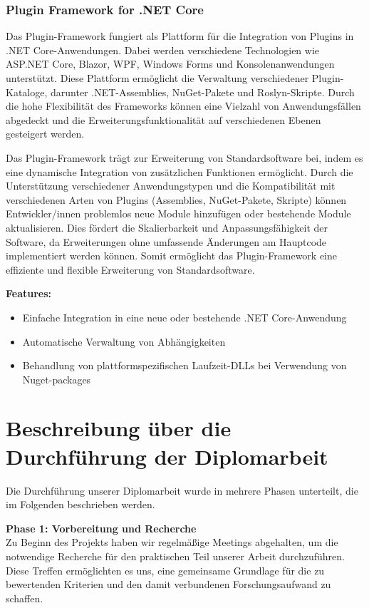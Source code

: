 \subsubsection*{Plugin Framework for .NET Core}

Das Plugin-Framework fungiert als Plattform für die Integration von Plugins in .NET Core-Anwendungen. 
Dabei werden verschiedene Technologien wie ASP.NET Core, Blazor, WPF, Windows Forms und 
Konsolenanwendungen unterstützt. Diese Plattform ermöglicht die Verwaltung verschiedener 
Plugin-Kataloge, darunter .NET-Assemblies, NuGet-Pakete und Roslyn-Skripte. Durch die hohe 
Flexibilität des Frameworks können eine Vielzahl von Anwendungsfällen abgedeckt und die 
Erweiterungsfunktionalität auf verschiedenen Ebenen gesteigert werden. 
\cite{pluginframework}

Das Plugin-Framework trägt zur Erweiterung von Standardsoftware bei, indem es eine dynamische 
Integration von zusätzlichen Funktionen ermöglicht. Durch die Unterstützung verschiedener 
Anwendungstypen und die Kompatibilität mit verschiedenen Arten von Plugins (Assemblies, NuGet-Pakete, 
Skripte) können Entwickler/innen problemlos neue Module hinzufügen oder bestehende Module 
aktualisieren. Dies fördert die Skalierbarkeit und Anpassungsfähigkeit der Software, da 
Erweiterungen ohne umfassende Änderungen am Hauptcode implementiert werden können. Somit 
ermöglicht das Plugin-Framework eine effiziente und flexible Erweiterung von Standardsoftware.
\cite{pluginframework}

\textbf{Features:}
\begin{itemize}
    \item Einfache Integration in eine neue oder bestehende .NET Core-Anwendung
    \item Automatische Verwaltung von Abhängigkeiten
    \item Behandlung von plattformspezifischen Laufzeit-DLLs bei Verwendung von Nuget-packages
\end{itemize}
\cite{pluginframework}

\newpage
\section{Beschreibung über die Durchführung der Diplomarbeit}

Die Durchführung unserer Diplomarbeit wurde in mehrere Phasen unterteilt, 
die im Folgenden beschrieben werden.

\textbf{Phase 1: Vorbereitung und Recherche}\\
Zu Beginn des Projekts haben wir regelmäßige Meetings abgehalten, um die notwendige 
Recherche für den praktischen Teil unserer Arbeit durchzuführen. Diese Treffen 
ermöglichten es uns, eine gemeinsame Grundlage für die zu bewertenden Kriterien und 
den damit verbundenen Forschungsaufwand zu schaffen.\\

